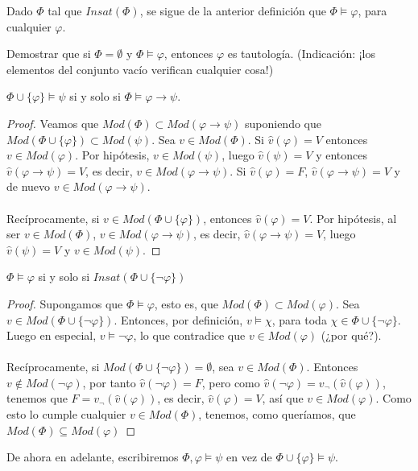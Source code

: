 \begin{example} Dado $\Phi$ tal que $Insat(\Phi)$, se sigue de la anterior definición que $\Phi \vDash \varphi$, para cualquier $\varphi$.
\end{example}

\begin{ex} Demostrar que si $\Phi = \emptyset$ y $\Phi \vDash \varphi$, entonces $\varphi$ es tautología. (Indicación: ¡los elementos del conjunto vacío verifican cualquier cosa!)
\end{ex}

\begin{prop} $\Phi \cup \{\varphi\} \vDash \psi$ si y solo si $\Phi \vDash \varphi \rightarrow \psi$.
\end{prop}
\begin{proof}
Veamos que $Mod(\Phi) \subset Mod(\varphi \rightarrow \psi)$ suponiendo que $Mod(\Phi \cup \{\varphi\}) \subset Mod(\psi)$. Sea $v \in Mod(\Phi)$. Si $\hat{v}(\varphi) = V$ entonces $v \in Mod(\varphi)$. Por hipótesis, $v \in Mod(\psi)$, luego $\hat{v}(\psi) = V$ y entonces $\hat{v}(\varphi \rightarrow \psi) = V$, es decir, $v \in Mod(\varphi \rightarrow \psi)$. Si  $\hat{v}(\varphi) = F$, $\hat{v}(\varphi \rightarrow \psi) = V$ y de nuevo $v \in Mod(\varphi \rightarrow \psi)$. \\ \\
Recíprocamente, si $v\in Mod(\Phi \cup \{\varphi\})$, entonces $\hat{v}(\varphi) = V$. Por hipótesis, al ser $v \in Mod(\Phi)$, $v \in Mod(\varphi \rightarrow \psi)$, es decir, $\hat{v}(\varphi \rightarrow \psi) = V$, luego $\hat{v}(\psi) = V$ y $v \in Mod(\psi)$.
\end{proof}

\begin{prop} $\Phi \vDash \varphi$ si y solo si $Insat(\Phi \cup \{\neg \varphi\})$
\end{prop}
\begin{proof}
Supongamos que $\Phi \vDash \varphi$, esto es, que $Mod(\Phi) \subset Mod(\varphi)$. Sea $v \in Mod(\Phi \cup \{\neg \varphi\})$. Entonces, por definición, $v \vDash \chi$, para toda $\chi \in \Phi \cup \{\neg \varphi\}$. Luego en especial, $v \vDash \neg \varphi$, lo que contradice que $v \in Mod(\varphi)$ (¿por qué?). \\ \\
Recíprocamente, si $Mod(\Phi \cup \{\neg \varphi\}) = \emptyset$, sea $v \in Mod(\Phi)$. Entonces $v\notin Mod(\neg \varphi)$, por tanto $\hat{v}(\neg \varphi)=F$, pero como $\hat{v}(\neg \varphi)=v_\neg(\hat{v}(\varphi))$, tenemos que $F=v_\neg(\hat{v}(\varphi))$, es decir, $\hat{v}(\varphi)=V$, así que $v\in Mod(\varphi)$. Como esto lo cumple cualquier $v \in Mod(\Phi)$, tenemos, como queríamos, que $Mod(\Phi)\subseteq Mod(\varphi)$


\end{proof} 
De ahora en adelante, escribiremos $\Phi, \varphi \vDash \psi$ en vez de $\Phi \cup \{\varphi\} \vDash \psi$.

